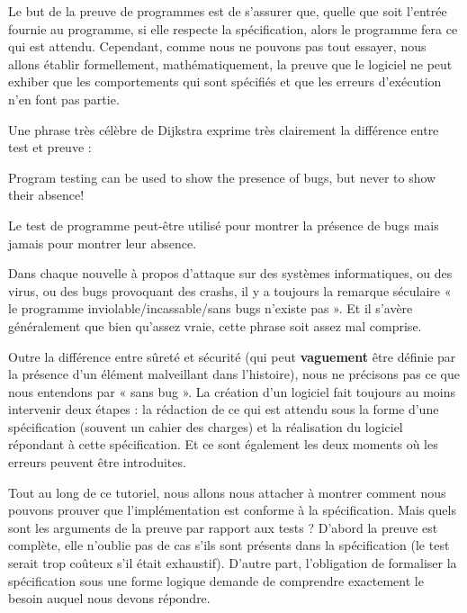 \documentclass[middle]{zmdocument}
\begin{document}
Le but de la preuve de programmes est de s'assurer que, quelle que soit l'entrée
fournie au programme, si elle respecte la spécification, alors le programme 
fera ce qui est attendu. Cependant, comme nous ne pouvons pas tout essayer, nous 
allons établir formellement, mathématiquement, la preuve que le logiciel ne 
peut exhiber que les comportements qui sont spécifiés et que les erreurs 
d'exécution n'en font pas partie.



Une phrase très célèbre de Dijkstra exprime très clairement la différence entre
test et preuve :



\begin{Quotation}[Dijkstra]
Program testing can be used to show the presence of bugs, but never to show 
their absence!
\end{Quotation}



Le test de programme peut-être utilisé pour montrer la présence de bugs mais 
jamais pour montrer leur absence.





Dans chaque nouvelle à propos d'attaque sur des systèmes informatiques, ou 
des virus, ou des bugs provoquant des crashs, il y a toujours la remarque 
séculaire « le programme inviolable/incassable/sans bugs n'existe pas ». Et 
il s'avère généralement que bien qu'assez vraie, cette phrase soit assez 
mal comprise.



Outre la différence entre sûreté et sécurité (qui peut \textbf{vaguement} être 
définie par la présence d'un élément malveillant dans l'histoire), nous ne 
précisons pas ce que nous entendons par « sans bug ». La création d'un logiciel
fait toujours au moins intervenir deux étapes : la rédaction de ce qui est
attendu sous la forme d'une spécification (souvent un cahier des charges) 
et la réalisation du logiciel répondant à cette spécification. Et ce sont 
également les deux moments où les erreurs peuvent être introduites.



Tout au long de ce tutoriel, nous allons nous attacher à montrer comment nous 
pouvons prouver que l'implémentation est conforme à la spécification. Mais 
quels sont les arguments de la preuve par rapport aux tests ? D'abord la preuve
est complète, elle n'oublie pas de cas s'ils sont présents dans la spécification 
(le test serait trop coûteux s'il était exhaustif). D'autre part, l'obligation 
de formaliser la spécification sous une forme logique demande de comprendre 
exactement le besoin auquel nous devons répondre.
\end{document}
